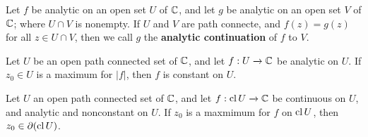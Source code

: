 \begin{definition}
    Let $f$ be analytic on an open set  $U$ of  $\mathbb{C}$, and let  $g$ be analytic
    on an open set  $V$ of  $\mathbb{C}$; where  $U \cap V$ is nonempty. If  $U$ and $V$
    are path connecte, and $f(z)=g(z)$ for all $z \in U \cap V$, then we call
    $g$ the  \textbf{analytic continuation} of $f$ to  $V$.
\end{definition}

\begin{theorem}\label{3.1.5}
    Let $U$ be an open path connected set of $\mathbb{C}$, and let $f:U \xrightarrow{}
    \mathbb{C}$ be analytic on $U$. If  $z_0 \in U$ is a maximum for $|f|$, then  $f$ is
    constant on  $U$.
\end{theorem}
\begin{corollary}
    Let $U$ an open path connected set of $\mathbb{C}$, and let $f:\operatorname{cl}{U} \xrightarrow{} \mathbb{C}$
    be continuous on $U$, and analytic and nonconstant on  $U$. If  $z_0$ is a
    maxmimum for $f$ on  $\operatorname{cl}{U}$, then $z_0 \in \partial{(\operatorname{cl}{U})}$.
\end{corollary}
